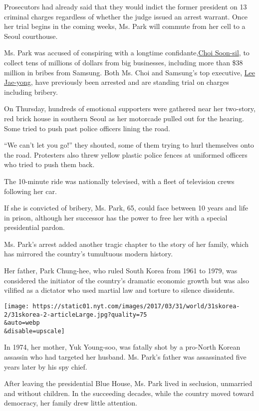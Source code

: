Prosecutors had already said that they would indict the former president
on 13 criminal charges regardless of whether the judge issued an arrest
warrant. Once her trial begins in the coming weeks, Ms. Park will
commute from her cell to a Seoul courthouse.

Ms. Park was accused of conspiring with a longtime
confidante,\href{https://www.nytimes.com/2016/11/06/world/asia/south-koreans-ashamed-over-les-secretive-adviser.html}{Choi
Soon-sil}, to collect tens of millions of dollars from big businesses,
including more than \$38 million in bribes from Samsung. Both Ms. Choi
and Samsung's top executive,
\href{https://www.nytimes.com/2017/02/17/business/samsung-heir-arrested-south-korea.html}{Lee
Jae-yong}, have previously been arrested and are standing trial on
charges including bribery.

On Thursday, hundreds of emotional supporters were gathered near her
two-story, red brick house in southern Seoul as her motorcade pulled out
for the hearing. Some tried to push past police officers lining the
road.

``We can't let you go!'' they shouted, some of them trying to hurl
themselves onto the road. Protesters also threw yellow plastic police
fences at uniformed officers who tried to push them back.

The 10-minute ride was nationally televised, with a fleet of television
crews following her car.

If she is convicted of bribery, Ms. Park, 65, could face between 10
years and life in prison, although her successor has the power to free
her with a special presidential pardon.

Ms. Park's arrest added another tragic chapter to the story of her
family, which has mirrored the country's tumultuous modern history.

Her father, Park Chung-hee, who ruled South Korea from 1961 to 1979, was
considered the initiator of the country's dramatic economic growth but
was also vilified as a dictator who used martial law and torture to
silence dissidents.

\texttt{[image: https://static01.nyt.com/images/2017/03/31/world/31skorea-2/31skorea-2-articleLarge.jpg?quality=75\\\&auto=webp\\\&disable=upscale]}

In 1974, her mother, Yuk Young-soo, was fatally shot by a pro-North
Korean assassin who had targeted her husband. Ms. Park's father was
assassinated five years later by his spy chief.

After leaving the presidential Blue House, Ms. Park lived in seclusion,
unmarried and without children. In the succeeding decades, while the
country moved toward democracy, her family drew little attention.

